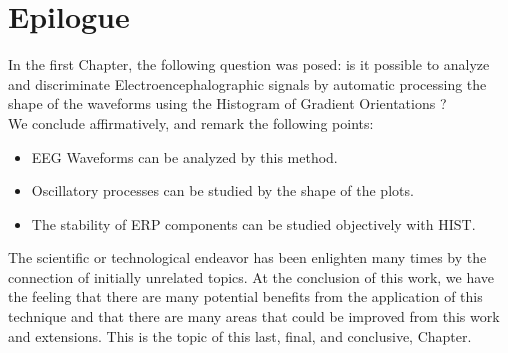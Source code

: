 \chapter{Epilogue}
\label{chapter:seven}


In the first Chapter, the following question was posed:  is it possible to analyze and discriminate Electroencephalographic signals by automatic processing the shape of the waveforms using the Histogram of Gradient Orientations ? \\ 


We conclude affirmatively, and remark the following points:

%

\begin{itemize}
\item EEG Waveforms can be analyzed by this method.
\item Oscillatory processes can be studied by the shape of the plots.
\item The stability of ERP components can be studied objectively with HIST.
\end{itemize}

The scientific or technological endeavor has been enlighten many times by the connection of initially unrelated topics.  At the conclusion of this work, we have the feeling that there are many potential benefits from the application of this technique and that there are many areas that could be improved from this work and extensions.   This is the topic of this last, final, and conclusive, Chapter.

